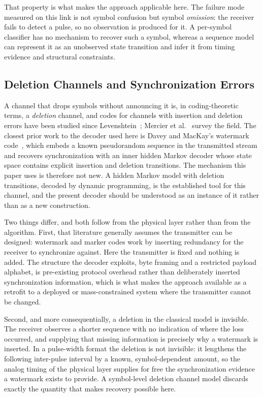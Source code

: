 That property is what makes the approach applicable here. The failure mode
measured on this link is not symbol confusion but symbol \emph{omission}: the
receiver fails to detect a pulse, so no observation is produced for it. A
per-symbol classifier has no mechanism to recover such a symbol, whereas a
sequence model can represent it as an unobserved state transition and infer it
from timing evidence and structural constraints.

\subsection{Deletion Channels and Synchronization Errors}

A channel that drops symbols without announcing it is, in coding-theoretic
terms, a \emph{deletion} channel, and codes for channels with insertion and
deletion errors have been studied since Levenshtein~\cite{Levenshtein1966};
Mercier et al.~\cite{Mercier2010} survey the field. The closest prior work to
the decoder used here is Davey and MacKay's watermark
code~\cite{Davey2001}, which embeds a known pseudorandom sequence in the
transmitted stream and recovers synchronization with an inner hidden Markov
decoder whose state space contains explicit insertion and deletion transitions.
The mechanism this paper uses is therefore not new. A hidden Markov model with
deletion transitions, decoded by dynamic programming, is the established tool
for this channel, and the present decoder should be understood as an instance
of it rather than as a new construction.

Two things differ, and both follow from the physical layer rather than from the
algorithm. First, that literature generally assumes the transmitter can be
designed: watermark and marker codes work by inserting redundancy for the
receiver to synchronize against. Here the transmitter is fixed and nothing is
added. The structure the decoder exploits, byte framing and a restricted
payload alphabet, is pre-existing protocol overhead rather than deliberately
inserted synchronization information, which is what makes the approach
available as a retrofit to a deployed or mass-constrained system where the
transmitter cannot be changed.

Second, and more consequentially, a deletion in the classical model is
invisible. The receiver observes a shorter sequence with no indication of where
the loss occurred, and supplying that missing information is precisely why a
watermark is inserted. In a pulse-width format the deletion is not invisible:
it lengthens the following inter-pulse interval by a known, symbol-dependent
amount, so the analog timing of the physical layer supplies for free the
synchronization evidence a watermark exists to provide. A symbol-level deletion
channel model discards exactly the quantity that makes recovery possible here.

